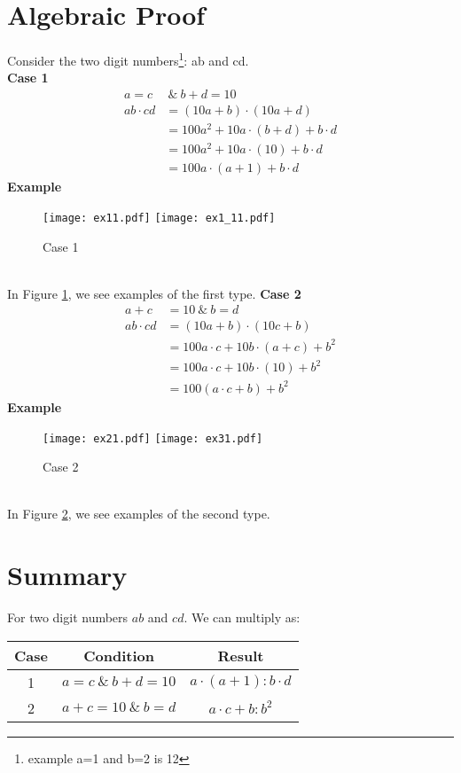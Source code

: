 \documentclass{article}
\begin{document}
\section{Algebraic Proof}
Consider the two digit numbers\footnote{example a=1 and b=2 is 12}: ab and cd.\\
\Large{\textbf{ Case 1}}
\begin{align}
a=c&\ \& \ b+d=10\\
ab\cdot cd&=(10a+b)\cdot(10a+d)\\
&=100a^2+10a\cdot (b+d)+b\cdot d\\
&=100a^2+10a\cdot (10)+b\cdot d\\
&=100a\cdot(a+1)+b\cdot d
\end{align}
\Large{\textbf{ Example}}\\
\begin{figure}[h]
  \centering
    \texttt{[image: ex11.pdf]}
    \texttt{[image: ex1\_11.pdf]}
  \caption{Case 1}
  \label{fig:case1}
\end{figure}\\
In Figure \ref{fig:case1}, we see examples of the first type.
\newpage
\Large{\textbf{ Case 2}}
\begin{align}
a+c & =10\ \& \ b=d\\
ab\cdot cd&=(10a+b)\cdot(10c+b)\\
&=100a\cdot c+10b\cdot (a+c)+b^2 \\
&=100a\cdot c+10b\cdot (10)+b^2\\
&=100(a\cdot c+b) + b^2
\end{align}
\Large{\textbf{ Example}}\\
\begin{figure}[h]
  \centering
    \texttt{[image: ex21.pdf]}
    \texttt{[image: ex31.pdf]}
  \caption{Case 2}
  \label{fig:case2}
\end{figure}\\
In Figure \ref{fig:case2}, we see examples of the second type.


\section{Summary}
For two digit numbers $ab$ and $cd$. We can multiply as:\\

\begin{tabular}{|c|c|c|}
\hline
    \textbf{Case} & \textbf{Condition} & \textbf{Result}\\
    \hline \hline
     1 & $a=c\ \&\ b+d=10$ & $a\cdot (a+1):b\cdot d$ \\ \hline
     2 & $a+c=10\ \&\ b=d$ & $a\cdot c+b:b^2$ \\
\hline
\end{tabular}
\end{document}
